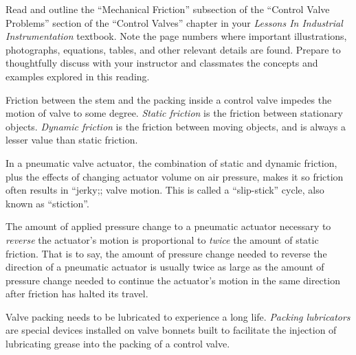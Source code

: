 

Read and outline the ``Mechanical Friction'' subsection of the ``Control Valve Problems'' section of the ``Control Valves'' chapter in your {\it Lessons In Industrial Instrumentation} textbook.  Note the page numbers where important illustrations, photographs, equations, tables, and other relevant details are found.  Prepare to thoughtfully discuss with your instructor and classmates the concepts and examples explored in this reading.














Friction between the stem and the packing inside a control valve impedes the motion of valve to some degree.  {\it Static friction} is the friction between stationary objects.  {\it Dynamic friction} is the friction between moving objects, and is always a lesser value than static friction.

\vskip 10pt

In a pneumatic valve actuator, the combination of static and dynamic friction, plus the effects of changing actuator volume on air pressure, makes it so friction often results in ``jerky;; valve motion.  This is called a ``slip-stick'' cycle, also known as ``stiction''.

\vskip 10pt

The amount of applied pressure change to a pneumatic actuator necessary to {\it reverse} the actuator's motion is proportional to {\it twice} the amount of static friction.  That is to say, the amount of pressure change needed to reverse the direction of a pneumatic actuator is usually twice as large as the amount of pressure change needed to continue the actuator's motion in the same direction after friction has halted its travel.

\vskip 10pt

Valve packing needs to be lubricated to experience a long life.  {\it Packing lubricators} are special devices installed on valve bonnets built to facilitate the injection of lubricating grease into the packing of a control valve.


